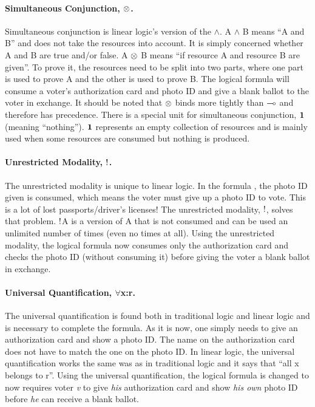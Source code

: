 \paragraph{Simultaneous Conjunction, $\otimes$.} Simultaneous conjunction is linear logic’s version of the $\wedge$. A $\wedge$ B means “A and B” and does not take the resources into account. It is simply concerned whether A and B are true and/or false. A $\otimes$ B means “if resource A and resource B are given”. To prove it, the resources need to be split into two parts, where one part is used to prove A and the other is used to prove B. The logical formula
will consume a voter’s authorization card and photo ID and give a blank ballot to the voter in exchange. It should be noted that $\otimes$ binds more tightly than $\multimap$ and therefore has precedence.
There is a special unit for simultaneous conjunction, $\mathord{\text{\rm\bf 1}}$ (meaning “nothing”). $\mathord{\text{\rm\bf 1}}$ represents an empty collection of resources and is mainly used when some resources are consumed but nothing is produced.

\paragraph{Unrestricted Modality, $\mathord{\text{\rm !}}$.} The unrestricted modality is unique to linear logic. In the formula , the photo ID given is consumed, which means the voter must give up a photo ID to vote. This is a lot of lost passports/driver’s licenses!
The unrestricted modality, $\mathord{\text{\rm !}}$, solves that problem. $\mathord{\text{\rm !}}$A is a version of A that is not consumed and can be used an unlimited number of times (even no times at all). Using the unrestricted modality, the logical formula
now consumes only the authorization card and checks the photo ID (without consuming it) before giving the voter a blank ballot in exchange. 

\paragraph{Universal Quantification, $\forall$x:r.} The universal quantification is found both in traditional logic and linear logic and is necessary to complete the formula. As it is now, one simply needs to give an authorization card and show a photo ID. The name on the authorization card does not have to match the one on the photo ID.
In linear logic, the universal quantification works the same was as in traditional logic and it says that “all x belongs to r”. Using the universal quantification, the logical formula is changed to
now requires voter \textit{v} to give \textit{his} authorization card and show \textit{his own} photo ID before \textit{he} can receive a blank ballot.


